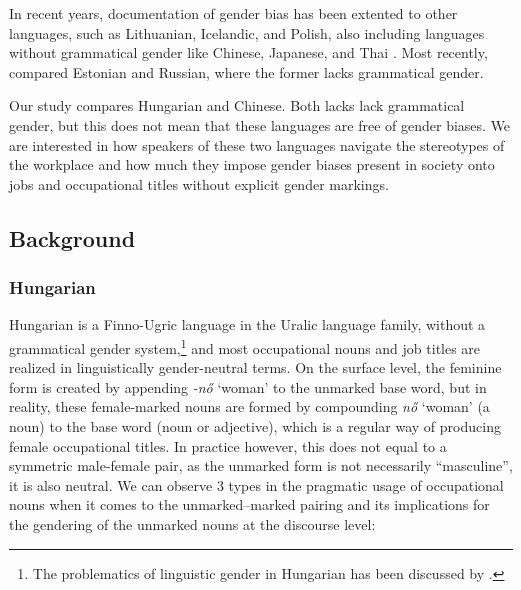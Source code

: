 \documentclass[10pt, a4paper]{article}
\begin{document}

In recent years, documentation of gender bias has been extented to other languages, such as Lithuanian, Icelandic, and Polish, also including languages without grammatical gender like Chinese, Japanese, and Thai \citep[][]{hellinger_2003_gender,pauwels_2003_linguistic}. Most recently, \citet{kaukonen_2025_gender} compared Estonian and Russian, where the former lacks grammatical gender.

Our study compares Hungarian and Chinese. Both lacks lack grammatical gender, but this does not mean that these languages are free of gender biases. We are interested in how speakers of these two languages navigate the stereotypes of the workplace and how much they impose gender biases present in society onto jobs and occupational titles without explicit gender markings.

\subsection{Background}

\subsubsection{Hungarian}

Hungarian is a Finno-Ugric language in the Uralic language family, without a grammatical gender system,\footnote{The problematics of linguistic gender in Hungarian has been discussed by \citet{vasvari_2014_problemas}.} and most occupational nouns and job titles are realized in linguistically gender-neutral terms. 
On the surface level, the feminine form is created by appending \textit{-nő} `woman' to the unmarked base word, but in reality, these female-marked nouns are formed by compounding \textit{nő} `woman' (a noun) to the base word (noun or adjective), which is a regular way of producing female occupational titles. In practice however, this does not equal to a symmetric male-female pair, as the unmarked form is not necessarily ``masculine'', it is also neutral. We can observe 3 types in the pragmatic usage of occupational nouns when it comes to the unmarked--marked pairing and its implications for the gendering of the unmarked nouns at the discourse level:
\end{document}
